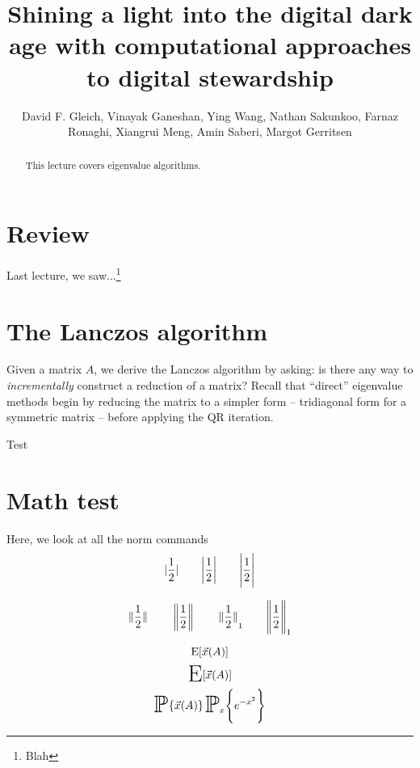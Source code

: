 \documentclass[longtitle,sidenotes]{dgleich-article}
\title{Shining a light into the digital dark age with computational approaches to digital stewardship}
\author{David F. Gleich, Vinayak Ganeshan, Ying Wang, Nathan Sakunkoo, Farnaz Ronaghi, Xiangrui Meng, Amin Saberi, Margot Gerritsen}
\begin{document}

 \maketitle

\begin{abstract}
 This lecture covers eigenvalue algorithms.
\end{abstract}

\section{Review}
Last lecture, we saw...\footnote{Blah}

\section{The Lanczos algorithm}
Given a matrix $A$, we derive the Lanczos algorithm by asking:
is there any way to \emph{incrementally} construct a reduction
of a matrix?
Recall that ``direct'' eigenvalue methods begin by reducing
the matrix to a simpler form -- tridiagonal form for a
symmetric matrix -- before applying the QR iteration.

\begin{theorem}%
 Test
\end{theorem}

\section{Math test}
Here, we look at all the norm commands
\[
 \absof{\frac{1}{2}} \qquad \absof*{\frac{1}{2}} \qquad \absof[\Bigg]{\frac{1}{2}}
\]

\[
 \normof{\frac{1}{2}} \qquad \normof*{\frac{1}{2}}
 \qquad \normof[1]{\frac{1}{2}} 
 \qquad \normof[1][\Bigg]{\frac{1}{2}} 
\]

\[ \operatorname{E}[\vec{x}(A)] \]
\[ \hugeEof{\vx(A)} \]
\[ \hugeprob{\vx(A)} \hugeprob[x][\Bigg]{e^{-x^2}} \]
\end{document}

